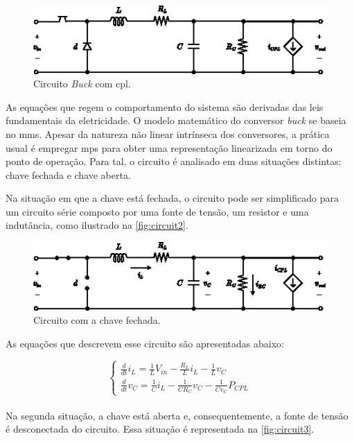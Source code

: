 \begin{figure}[H]
  \centering
  \includegraphics[scale=2.5]{figuras/buck_conversor_with_cpl_circuit.eps}
  \caption{Circuito \textit{Buck} com \acrshort{cpl}.}
  \label{fig:circuit1}
\end{figure}

As equações que regem o comportamento do sistema são derivadas das leis fundamentais da eletricidade. O modelo matemático do conversor \textit{buck} se baseia no \acrshort{mms}. Apesar da natureza não linear intrínseca dos conversores, a prática usual é empregar \acrshort{mps} para obter uma representação linearizada em torno do ponto de operação. Para tal, o circuito é analisado em duas situações distintas: chave fechada e chave aberta.

Na situação em que a chave está fechada, o circuito pode ser simplificado para um circuito série composto por uma fonte de tensão, um resistor e uma indutância, como ilustrado na \autoref{fig:circuit2}.

\begin{figure}[H]
  \centering
  \includegraphics[scale=2.5]{figuras/buck_conversor_with_cpl_circuit_m1.eps}
  \caption{Circuito com a chave fechada.}
  \label{fig:circuit2}
\end{figure}

\noindent As equações que descrevem esse circuito são apresentadas abaixo:

\begin{equation}
  \begin{cases}
    \frac{d}{dt}i_L =  \frac{1}{L} V_{in}  - \frac{R_L}{L} i_L - \frac{1}{L} v_C \\
    \frac{d}{dt} v_C = \frac{1}{C} i_L - \frac{1}{C R_C} v_C - \frac{1}{C v_C} P_{CPL}
    \label{eq:circuito-m1}
  \end{cases}
\end{equation}
\\
\indent Na segunda situação, a chave está aberta e, consequentemente, a fonte de tensão é desconectada do circuito. Essa situação é representada na \autoref{fig:circuit3}.

